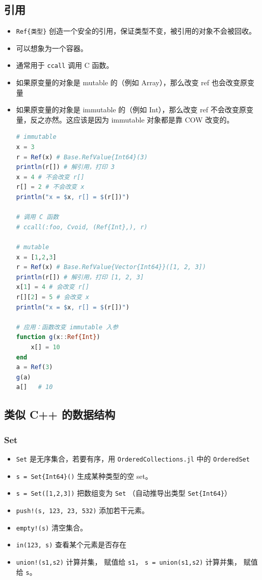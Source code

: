 \subsection{引用}
\begin{itemize}
\item \verb`Ref{类型}` 创造一个安全的引用，保证类型不变，被引用的对象不会被回收。
\item 可以想象为一个容器。
\item 通常用于 \verb`ccall` 调用 C 函数。
\item 如果原变量的对象是 mutable 的（例如 Array），那么改变 ref 也会改变原变量
\item 如果原变量的对象是 immutable 的（例如 Int），那么改变 ref 不会改变原变量，反之亦然。这应该是因为 immutable 对象都是靠 COW 改变的。
\begin{lstlisting}[language=julia]
# immutable
x = 3
r = Ref(x) # Base.RefValue{Int64}(3)
println(r[]) # 解引用，打印 3
x = 4 # 不会改变 r[]
r[] = 2 # 不会改变 x
println("x = $x, r[] = $(r[])")

# 调用 C 函数
# ccall(:foo, Cvoid, (Ref{Int},), r)

# mutable
x = [1,2,3]
r = Ref(x) # Base.RefValue{Vector{Int64}}([1, 2, 3])
println(r[]) # 解引用，打印 [1, 2, 3]
x[1] = 4 # 会改变 r[]
r[][2] = 5 # 会改变 x
println("x = $x, r[] = $(r[])")

# 应用：函数改变 immutable 入参
function g(x::Ref{Int})
    x[] = 10
end
a = Ref(3)
g(a)
a[]   # 10
\end{lstlisting}
\end{itemize}


\subsection{类似 C++ 的数据结构}
\subsubsection{Set}
\begin{itemize}
\item \verb`Set` 是无序集合，若要有序，用 \verb`OrderedCollections.jl` 中的 \verb`OrderedSet`
\item \verb`s = Set{Int64}()` 生成某种类型的空 set。
\item \verb`s = Set([1,2,3])` 把数组变为 \verb`Set` （自动推导出类型 \verb`Set{Int64}`）
\item \verb`push!(s, 123, 23, 532)` 添加若干元素。
\item \verb`empty!(s)` 清空集合。
\item \verb`in(123, s)` 查看某个元素是否存在
\item \verb`union!(s1,s2)` 计算并集， 赋值给 \verb`s1`， \verb`s = union(s1,s2)` 计算并集， 赋值给 \verb`s`。
\end{itemize}

